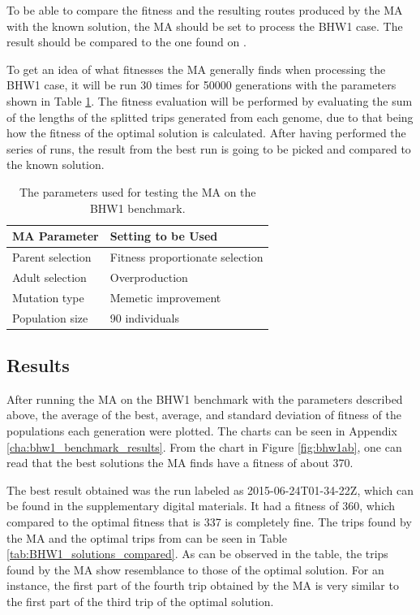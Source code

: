 To be able to compare the fitness and the resulting routes produced by the MA with the known solution, the MA should be set to process the BHW1 case. The result should be compared to the one found on \citet{BHW1Solution}.

To get an idea of what fitnesses the MA generally finds when processing the BHW1 case, it will be run 30 times for 50000 generations with the parameters shown in Table \ref{tab:BHW1_params_table}. The fitness evaluation will be performed by evaluating the sum of the lengths of the splitted trips generated from each genome, due to that being how the fitness of the optimal solution is calculated. After having performed the series of runs, the result from the best run is going to be picked and compared to the known solution.

{
\begin{table}[tbph]
\centering
\begin{tabular}{ll}
\toprule
\textbf{MA Parameter} & \textbf{Setting to be Used}     \\ \midrule
Parent selection      & Fitness proportionate selection \\
Adult selection       & Overproduction                  \\
Mutation type         & Memetic improvement             \\
Population size       & 90 individuals                  \\ \bottomrule
\end{tabular}
\caption{The parameters used for testing the MA on the BHW1 benchmark.}
\label{tab:BHW1_params_table}
\end{table}
}

\subsection{Results}

After running the MA on the BHW1 benchmark with the parameters described above, the average of the best, average, and standard deviation of fitness of the populations each generation were plotted. The charts can be seen in Appendix \ref{cha:bhw1_benchmark_results}. From the chart in Figure \ref{fig:bhw1ab}, one can read that the best solutions the MA finds have a fitness of about 370.

The best result obtained was the run labeled as 2015-06-24T01-34-22Z, which can be found in the supplementary digital materials. It had a fitness of 360, which compared to the optimal fitness that is 337 is completely fine. The trips found by the MA and the optimal trips from \citet{BHW1Solution} can be seen in Table \ref{tab:BHW1_solutions_compared}. As can be observed in the table, the trips found by the MA show resemblance to those of the optimal solution. For an instance, the first part of the fourth trip obtained by the MA is very similar to the first part of the third trip of the optimal solution.


